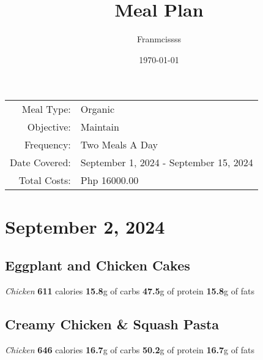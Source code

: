 \documentclass{article}%
\title{Meal Plan}%
\author{Franmcissss}%
\date{\today}%
\begin{document}
%
\normalsize%
\maketitle%


\begin{table}[H]%
\begin{tabular}{rl}%
Meal Type:&Organic\\%
Objective:&Maintain\\%
Frequency:&Two Meals A Day\\%
Date Covered:&September 1, 2024 {-} September 15, 2024\\%
Total Costs:&Php 16000.00\\%
\end{tabular}%
\end{table}

%
\section*{September 2, 2024}%
\label{sec:September2,2024}%
\begin{paracol}[2]{2}%
\sloppy%
\subsection*{Eggplant and Chicken Cakes}%
\label{subsec:EggplantandChickenCakes}%
\textit{Chicken}%
\newline%
\newline%
\textbf{611} calories%
\newline%
\textbf{15.8}g of carbs%
\newline%
\textbf{47.5}g of protein%
\newline%
\textbf{15.8}g of fats%
\newline%
\switchcolumn

%
\subsection*{Creamy Chicken \& Squash Pasta}%
\label{subsec:CreamyChickenSquashPasta}%
\textit{Chicken}%
\newline%
\newline%
\textbf{646} calories%
\newline%
\textbf{16.7}g of carbs%
\newline%
\textbf{50.2}g of protein%
\newline%
\textbf{16.7}g of fats%
\newline%
\switchcolumn

%
\end{paracol}
\end{document}
